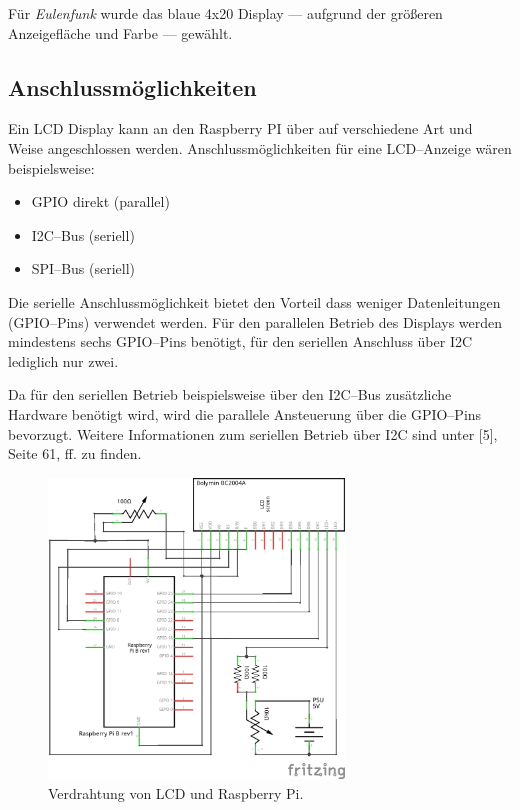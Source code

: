 \documentclass[11pt,ngerman,toc=listof,index=totoc]{scrreprt}
\providecommand{\tightlist}{%
  \setlength{\itemsep}{0pt}\setlength{\parskip}{0pt}}
\begin{document}
Für \emph{Eulenfunk} wurde das blaue 4x20 Display --- aufgrund der
größeren Anzeigefläche und Farbe --- gewählt.

\subsection{Anschlussmöglichkeiten}\label{anschlussmuxf6glichkeiten}

Ein LCD Display kann an den Raspberry PI über auf verschiedene Art und
Weise angeschlossen werden. Anschlussmöglichkeiten für eine LCD--Anzeige
wären beispielsweise:

\begin{itemize}
\tightlist
\item
  GPIO direkt (parallel)
\item
  I2C--Bus (seriell)
\item
  SPI--Bus (seriell)
\end{itemize}

Die serielle Anschlussmöglichkeit bietet den Vorteil dass weniger
Datenleitungen (GPIO--Pins) verwendet werden. Für den parallelen Betrieb
des Displays werden mindestens sechs GPIO--Pins benötigt, für den
seriellen Anschluss über I2C lediglich nur zwei.

Da für den seriellen Betrieb beispielsweise über den I2C--Bus
zusätzliche Hardware benötigt wird, wird die parallele Ansteuerung über
die GPIO--Pins bevorzugt. Weitere Informationen zum seriellen Betrieb
über I2C sind unter {[}5{]}, Seite 61, ff. zu finden.

\begin{figure}[h!]
  \centering
\includegraphics[width=0.7\textwidth]{images/lcdraspi.png}
  \caption{Verdrahtung von LCD und Raspberry Pi.}
  \label{lcd}
\end{figure}
\end{document}
